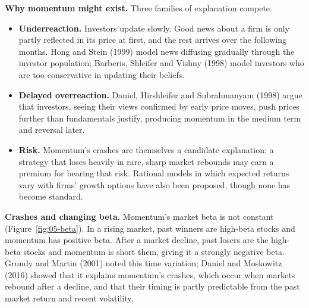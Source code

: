 \textbf{Why momentum might exist.} Three families of explanation compete.

\begin{itemize}
  \item \textbf{Underreaction.} Investors update slowly. Good news about a firm is only partly reflected in its price at first, and the rest arrives over the following months. Hong and Stein (1999) model news diffusing gradually through the investor population; Barberis, Shleifer and Vishny (1998) model investors who are too conservative in updating their beliefs.
  \item \textbf{Delayed overreaction.} Daniel, Hirshleifer and Subrahmanyam (1998) argue that  investors, seeing their views confirmed by early price moves, push prices further than fundamentals justify, producing momentum in the medium term and reversal later.
  \item \textbf{Risk.} Momentum's crashes are themselves a candidate explanation: a strategy that loses heavily in rare, sharp market rebounds may earn a premium for bearing that risk. Rational models in which expected returns vary with firms' growth options have also been proposed, though none has become standard.
\end{itemize}

\textbf{Crashes and changing beta.} Momentum's market beta is not constant (Figure~\ref{fig:05-beta}). In a rising market, past winners are high-beta stocks and momentum has positive beta. After a market decline, past losers are the high-beta stocks and momentum is short them, giving it a strongly negative beta. Grundy and Martin (2001) noted this time variation; Daniel and Moskowitz (2016) showed that it explains momentum's crashes, which occur when markets rebound after a decline, and that their timing is partly predictable from the past market return and recent volatility.

